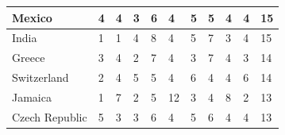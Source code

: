 \documentclass[12pt]{article}  %
\begin{document}
\begin{subappendices}
\begin{longtable}{|l|l|l|l|l|l|l|l|l|l|l|}
	\hline
	Mexico                                                         & 4                                                 & 4                                                 & 3                                                 & 6                                                 & 4                                                 & 5                                                 & 5    & 4      & 4      & 15     \\ 
	\hline
	India                                                          & 1                                                 & 1                                                 & 4                                                 & 8                                                 & 4                                                 & 5                                                 & 7    & 3      & 4      & 15     \\ 
	\hline
	Greece                                                         & 3                                                 & 4                                                 & 2                                                 & 7                                                 & 4                                                 & 3                                                 & 7    & 4      & 3      & 14     \\ 
	\hline
	Switzerland                                                    & 2                                                 & 4                                                 & 5                                                 & 5                                                 & 4                                                 & 6                                                 & 4    & 4      & 6      & 14     \\ 
	\hline
	Jamaica                                                        & 1                                                 & 7                                                 & 2                                                 & 5                                                 & 12                                                & 3                                                 & 4    & 8      & 2      & 13     \\ 
	\hline
	Czech Republic                                                 & 5                                                 & 3                                                 & 3                                                 & 6                                                 & 4                                                 & 5                                                 & 6    & 4      & 4      & 13     \\ 

\end{longtable}
\end{subappendices}
\end{document}
